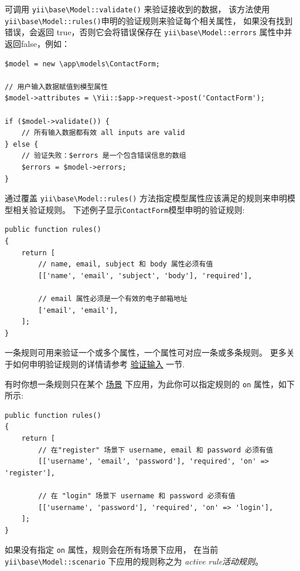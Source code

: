 可调用 \texttt{yii{\allowbreak{}\textbackslash}base{\allowbreak{}\textbackslash}Model\allowbreak{}::\allowbreak{}validate()} 来验证接收到的数据，
该方法使用\texttt{yii{\allowbreak{}\textbackslash}base{\allowbreak{}\textbackslash}Model\allowbreak{}::\allowbreak{}rules()}申明的验证规则来验证每个相关属性，
如果没有找到错误，会返回 true，否则它会将错误保存在 \texttt{yii{\allowbreak{}\textbackslash}base{\allowbreak{}\textbackslash}Model\allowbreak{}::\allowbreak{}errors} 属性中并返回false，例如：

\lstset{language=php}\begin{lstlisting}
$model = new \app\models\ContactForm;

// 用户输入数据赋值到模型属性
$model->attributes = \Yii::$app->request->post('ContactForm');

if ($model->validate()) {
    // 所有输入数据都有效 all inputs are valid
} else {
    // 验证失败：$errors 是一个包含错误信息的数组
    $errors = $model->errors;
}
\end{lstlisting}
通过覆盖 \texttt{yii{\allowbreak{}\textbackslash}base{\allowbreak{}\textbackslash}Model\allowbreak{}::\allowbreak{}rules()} 方法指定模型属性应该满足的规则来申明模型相关验证规则。
下述例子显示\lstinline|ContactForm|模型申明的验证规则:

\lstset{language=php}\begin{lstlisting}
public function rules()
{
    return [
        // name, email, subject 和 body 属性必须有值
        [['name', 'email', 'subject', 'body'], 'required'],

        // email 属性必须是一个有效的电子邮箱地址
        ['email', 'email'],
    ];
}
\end{lstlisting}
一条规则可用来验证一个或多个属性，一个属性可对应一条或多条规则。
更多关于如何申明验证规则的详情请参考 \hyperref[input-validation.md]{验证输入} 一节.

有时你想一条规则只在某个 \hyperref[structure-models.md::::scenarios]{场景} 下应用，为此你可以指定规则的 \lstinline|on| 属性，如下所示:

\lstset{language=php}\begin{lstlisting}
public function rules()
{
    return [
        // 在"register" 场景下 username, email 和 password 必须有值
        [['username', 'email', 'password'], 'required', 'on' => 'register'],

        // 在 "login" 场景下 username 和 password 必须有值
        [['username', 'password'], 'required', 'on' => 'login'],
    ];
}
\end{lstlisting}
如果没有指定 \lstinline|on| 属性，规则会在所有场景下应用， 在当前\texttt{yii{\allowbreak{}\textbackslash}base{\allowbreak{}\textbackslash}Model\allowbreak{}::\allowbreak{}scenario}
下应用的规则称之为 \textit{active rule活动规则}。

